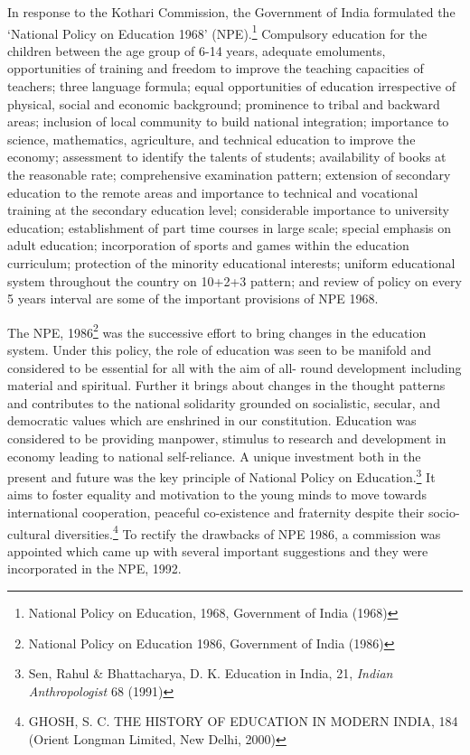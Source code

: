 \begin{multicols}{2}
\noi
In response to the Kothari Commission, the Government of India formulated the ‘National
Policy on Education 1968’ (NPE).\footnote{National Policy on Education, 1968, Government of India (1968)} Compulsory education for the children between the age
group of 6-14 years, adequate emoluments, opportunities of training and freedom to improve
the teaching capacities of teachers; three language formula; equal opportunities of education
irrespective of physical, social and economic background; prominence to tribal and backward
areas; inclusion of local community to build national integration; importance to science,
mathematics, agriculture, and technical education to improve the economy; assessment to
identify the talents of students; availability of books at the reasonable rate; comprehensive examination pattern; extension of secondary education to the remote areas and importance to
technical and vocational training at the secondary education level; considerable importance to
university education; establishment of part time courses in large scale; special emphasis on
adult education; incorporation of sports and games within the education curriculum;
protection of the minority educational interests; uniform educational system throughout the
country on 10+2+3 pattern; and review of policy on every 5 years interval are some of the
important provisions of NPE 1968.

\noi
The NPE, 1986\footnote{National Policy on Education 1986, Government of India (1986)} was the successive effort to bring changes in the education system. Under this policy, the role of education was seen to be manifold and considered to be essential for all with the aim of all- round development including material and spiritual. Further it brings
about changes in the thought patterns and contributes to the national solidarity grounded on
socialistic, secular, and democratic values which are enshrined in our constitution. Education
was considered to be providing manpower, stimulus to research and development in economy
leading to national self-reliance. A unique investment both in the present and future was the
key principle of National Policy on Education.\footnote{Sen, Rahul \& Bhattacharya, D. K. Education in India, 21, \textit{Indian Anthropologist} 68 (1991)} It aims to foster equality and motivation to
the young minds to move towards international cooperation, peaceful co-existence and
fraternity despite their socio- cultural diversities.\footnote{GHOSH, S. C. THE HISTORY OF EDUCATION IN MODERN INDIA, 184 (Orient Longman Limited, New Delhi, 2000)} To rectify the drawbacks of NPE 1986, a
commission was appointed which came up with several important suggestions and they were
incorporated in the NPE, 1992.


\end{multicols}
